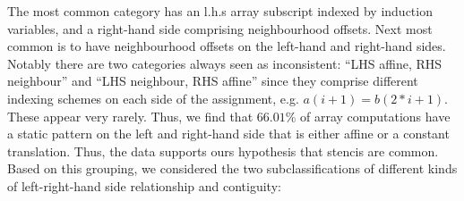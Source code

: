 \begin{center}
\begin{tabular}{ll|S[table-format=4]S[table-format=2.2]S[table-format=4]S[table-format=2.2]c}
\end{tabular}
\end{center}
%
The most common category has an l.h.s array subscript
indexed by induction variables, and a right-hand side comprising
neighbourhood offsets. Next most common is to have neighbourhood
offsets on the left-hand and right-hand sides. Notably
there are two categories always seen as inconsistent:
``LHS affine, RHS neighbour'' and ``LHS neighbour, RHS affine''
since they comprise different indexing schemes
on each side of the assignment, e.g. $a(i + 1) = b(2*i + 1)$. These
appear very rarely. Thus, we find that $66.01\%$ of array computations
have a static pattern on the left and right-hand side that is either
affine or a constant translation. Thus, the data supports ours
hypothesis that stencis are common. Based on this grouping, we
considered the two subclassifications of different kinds of
left-right-hand side relationship and contiguity:
